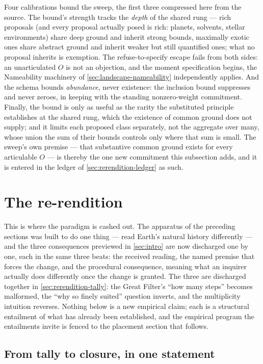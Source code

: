 \documentclass[11pt]{article}
\theoremstyle{definition}
\begin{document}
Four calibrations bound the sweep, the first three compressed here from the source. The bound's strength tracks the \emph{depth} of the shared rung --- rich proposals (and every proposal actually posed is rich: planets, solvents, stellar environments) share deep ground and inherit strong bounds, maximally exotic ones share abstract ground and inherit weaker but still quantified ones; what no proposal inherits is exemption. The refuse-to-specify escape fails from both sides: an unarticulated $O$ is not an objection, and the moment specification begins, the Nameability machinery of \autoref{sec:landscape-nameability} independently applies. And the schema bounds \emph{abundance}, never existence: the inclusion bound suppresses and never zeroes, in keeping with the standing nonzero-weight commitment. Finally, the bound is only as useful as the rarity the substituted principle establishes at the shared rung, which the existence of common ground does not supply; and it limits each proposed class separately, not the aggregate over many, whose union the sum of their bounds controls only where that sum is small. The sweep's own premise --- that substantive common ground exists for every articulable $O$ --- is thereby the one new commitment this subsection adds, and it is entered in the ledger of \autoref{sec:rerendition-ledger} as such.


\section{The re-rendition}
\label{sec:rerendition}
This is where the paradigm is cashed out. The apparatus of the preceding sections was built to do one thing --- read Earth's natural history differently --- and the three consequences previewed in \autoref{sec:intro} are now discharged one by one, each in the same three beats: the received reading, the named premise that forces the change, and the procedural consequence, meaning what an inquirer actually does differently once the change is granted. The three are discharged together in \autoref{sec:rerendition-tally}: the Great Filter's ``how many steps'' becomes malformed, the ``why so finely suited'' question inverts, and the multiplicity intuition reverses. Nothing below is a new empirical claim; each is a structural entailment of what has already been established, and the empirical program the entailments invite is fenced to the placement section that follows.

\subsection{From tally to closure, in one statement}\label{sec:rerendition-tally}
\end{document}
